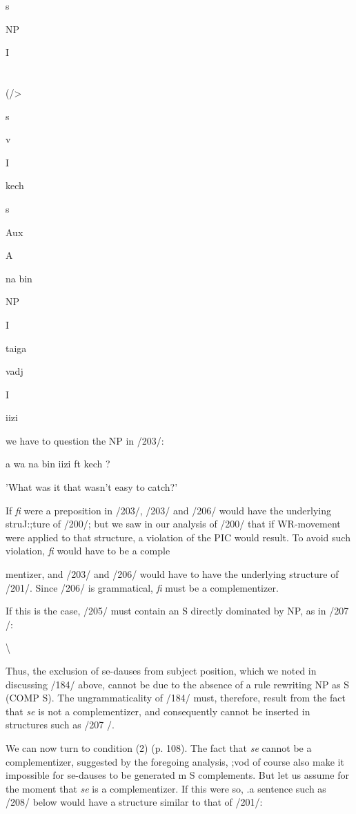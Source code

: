 s

NP

I

\section{}
(/{\textgreater}

s

v

I

kech

s

Aux

A

na bin

NP

I

taiga

vadj

I

iizi

we have to question the NP in /203/:

\ea\label{ex:206}
 a wa na bin iizi ft kech ?
\glt
\z

'What was it that wasn't easy to catch?'

If \textit{fi} were a preposition in /203/, /203/ and /206/ would have the under\-lying struJ:;ture of /200/; but we saw in our analysis of /200/ that if WR-movement were applied to that structure, a violation of the PIC
would result. To avoid such violation, \textit{fi} would have to be a comple\-

mentizer, and /203/ and /206/ would have to have the underlying structure of /201/. Since /206/ is grammatical, \textit{fi} must be a complementizer.

If this is the case, /205/ must contain an S directly dominated by NP, as in /207 /:

{\textbackslash}

Thus, the exclusion of se-dauses from subject position, which we noted in discussing /184/ above, cannot be due to the absence of a rule rewriting NP as S (COMP S). The ungrammaticality of /184/ must, therefore, result from the fact that \textit{se} is not a complementizer, and consequently cannot be inserted in structures such as /207 /.

We can now turn to condition (2) (p. 108). The fact that \textit{se}
cannot be a complementizer, suggested by the foregoing analysis,
;vod of course also make it impossible for se-dauses to be generated m S complements. But let us assume for the moment that \textit{se} is a com\-plementizer. If this were so, .a sentence such as /208/ below would have a structure similar to that of /201/:


